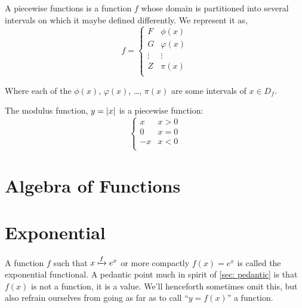 
A piecewise functions is a function \(f\) whose domain is partitioned into several
intervals on which it maybe defined differently. We represent it as, \[
    f = 
    \begin{cases}
        F & \phi(x) \\
        G & \varphi(x) \\
        \vdots & \vdots \\
        Z & \pi(x) \\
    \end{cases}
\]

Where each of the \(\phi(x)\), \(\varphi(x)\), \dots, \(\pi(x)\) are some intervals
of \(x \in D_f\).


\begin{example}
    The modulus function, \(y = \abs{x}\) is a piecewise function:
    \[
    \begin{cases}
        x & x > 0\\
        0 & x = 0\\
        -x & x < 0\\
    \end{cases}
\]
\end{example}

\section{Algebra of Functions}


\section{Exponential}


A function \(f\) such that \(x \xmapsto{f} e^x\) or more compactly \(f(x) = e^x\) is called
the exponential functional. A pedantic point much in spirit of \cref{sec: pedantic} 
is that \(f(x)\) is not a function, it is a value. We'll henceforth sometimes omit this, but also refrain ourselves
from going as far as to call ``\(y = f(x)\)'' a function. 

